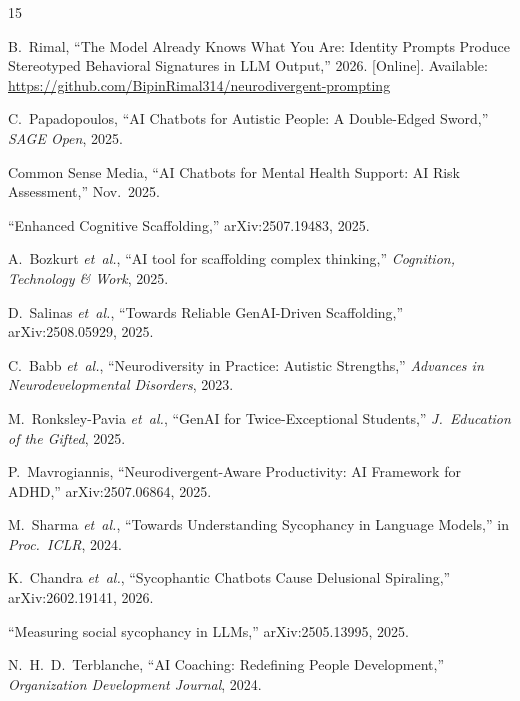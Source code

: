 \documentclass[conference]{IEEEtran}
\begin{document}
\begin{thebibliography}{15}

B.~Rimal, ``The Model Already Knows What You Are: Identity Prompts Produce Stereotyped Behavioral Signatures in LLM Output,'' 2026. [Online]. Available: \url{https://github.com/BipinRimal314/neurodivergent-prompting}

C.~Papadopoulos, ``AI Chatbots for Autistic People: A Double-Edged Sword,'' \textit{SAGE Open}, 2025.

Common Sense Media, ``AI Chatbots for Mental Health Support: AI Risk Assessment,'' Nov.\ 2025.

``Enhanced Cognitive Scaffolding,'' arXiv:2507.19483, 2025.

A.~Bozkurt \textit{et~al.}, ``AI tool for scaffolding complex thinking,'' \textit{Cognition, Technology \& Work}, 2025.

D.~Salinas \textit{et~al.}, ``Towards Reliable GenAI-Driven Scaffolding,'' arXiv:2508.05929, 2025.

C.~Babb \textit{et~al.}, ``Neurodiversity in Practice: Autistic Strengths,'' \textit{Advances in Neurodevelopmental Disorders}, 2023.

M.~Ronksley-Pavia \textit{et~al.}, ``GenAI for Twice-Exceptional Students,'' \textit{J.\ Education of the Gifted}, 2025.

P.~Mavrogiannis, ``Neurodivergent-Aware Productivity: AI Framework for ADHD,'' arXiv:2507.06864, 2025.

M.~Sharma \textit{et~al.}, ``Towards Understanding Sycophancy in Language Models,'' in \textit{Proc.\ ICLR}, 2024.

K.~Chandra \textit{et~al.}, ``Sycophantic Chatbots Cause Delusional Spiraling,'' arXiv:2602.19141, 2026.

``Measuring social sycophancy in LLMs,'' arXiv:2505.13995, 2025.

N.~H.~D.~Terblanche, ``AI Coaching: Redefining People Development,'' \textit{Organization Development Journal}, 2024.

\end{thebibliography}
\end{document}
